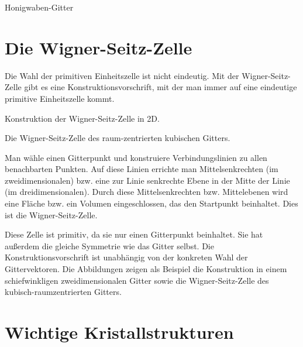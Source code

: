 \begin{marginfigure}

\caption{Honigwaben-Gitter}
\end{marginfigure}


\section{Die Wigner-Seitz-Zelle}

Die Wahl der primitiven Einheitszelle ist nicht eindeutig. Mit der Wigner-Seitz-Zelle gibt es eine Konstruktionsvorschrift, mit der man immer auf eine eindeutige primitive Einheitszelle kommt.



\begin{marginfigure}

\caption{Konstruktion der Wigner-Seitz-Zelle in 2D.}
\end{marginfigure}

\begin{marginfigure}

\caption{Die Wigner-Seitz-Zelle des raum-zentrierten kubischen Gitters.}
\end{marginfigure}

Man wähle einen Gitterpunkt und konstruiere Verbindungslinien zu allen benachbarten Punkten. Auf diese Linien errichte man Mittelsenkrechten (im zweidimensionalen) bzw. eine zur Linie senkrechte Ebene in der Mitte der Linie (im dreidimensionalen). Durch diese Mittelsenkrechten bzw. Mittelebenen wird eine Fläche bzw. ein Volumen eingeschlossen, das den Startpunkt beinhaltet. Dies ist die Wigner-Seitz-Zelle.

Diese Zelle ist primitiv, da sie nur einen Gitterpunkt beinhaltet. Sie hat außerdem die gleiche Symmetrie wie das Gitter selbst. Die Konstruktionsvorschrift ist unabhängig von der konkreten Wahl der Gittervektoren. Die Abbildungen zeigen als Beispiel die Konstruktion in einem schiefwinkligen zweidimensionalen Gitter sowie die Wigner-Seitz-Zelle des kubisch-raumzentrierten Gitters.


\section{Wichtige Kristallstrukturen}


